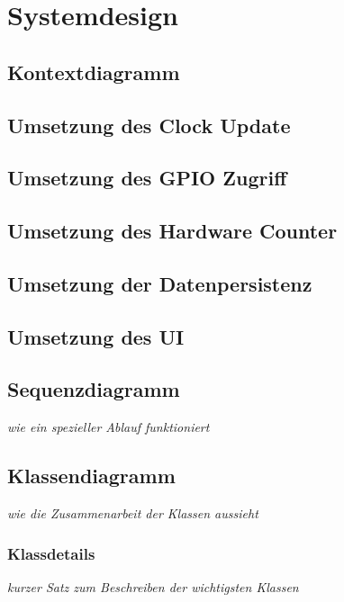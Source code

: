 \section{Systemdesign}
        \subsection{Kontextdiagramm}
    	\subsection{Umsetzung des Clock Update}
		\subsection{Umsetzung des GPIO Zugriff}
		\subsection{Umsetzung des Hardware Counter}
        \subsection{Umsetzung der Datenpersistenz}
        \subsection{Umsetzung des UI}
		\subsection{Sequenzdiagramm}
			\textit{wie ein spezieller Ablauf funktioniert}
		\subsection{Klassendiagramm}
			\textit{wie die Zusammenarbeit der Klassen aussieht}
			\subsubsection{Klassdetails}
				\textit{kurzer Satz zum Beschreiben der wichtigsten Klassen}